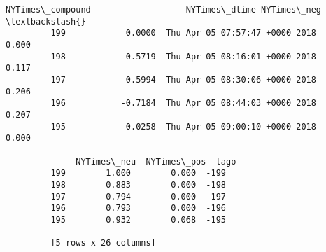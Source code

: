 \documentclass[11pt]{article}
\begin{document}
\begin{Verbatim}[commandchars=\\\{\}]
              NYTimes\_compound                   NYTimes\_dtime NYTimes\_neg  \textbackslash{}
         199            0.0000  Thu Apr 05 07:57:47 +0000 2018       0.000   
         198           -0.5719  Thu Apr 05 08:16:01 +0000 2018       0.117   
         197           -0.5994  Thu Apr 05 08:30:06 +0000 2018       0.206   
         196           -0.7184  Thu Apr 05 08:44:03 +0000 2018       0.207   
         195            0.0258  Thu Apr 05 09:00:10 +0000 2018       0.000   
         
              NYTimes\_neu  NYTimes\_pos  tago  
         199        1.000        0.000  -199  
         198        0.883        0.000  -198  
         197        0.794        0.000  -197  
         196        0.793        0.000  -196  
         195        0.932        0.068  -195  
         
         [5 rows x 26 columns]
\end{Verbatim}
            
\end{document}
